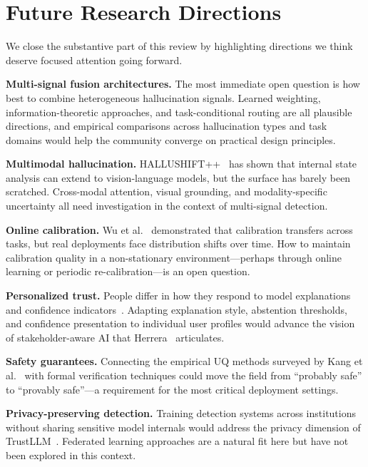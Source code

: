 \documentclass[journal]{IEEEtran}
\begin{document}
\section{Future Research Directions}

We close the substantive part of this review by highlighting directions we think deserve focused attention going forward.

\textbf{Multi-signal fusion architectures.} The most immediate open question is how best to combine heterogeneous hallucination signals. Learned weighting, information-theoretic approaches, and task-conditional routing are all plausible directions, and empirical comparisons across hallucination types and task domains would help the community converge on practical design principles.

\textbf{Multimodal hallucination.} HALLUSHIFT++~\cite{hallushift_pp} has shown that internal state analysis can extend to vision-language models, but the surface has barely been scratched. Cross-modal attention, visual grounding, and modality-specific uncertainty all need investigation in the context of multi-signal detection.

\textbf{Online calibration.} Wu et al.~\cite{calibrated_rl} demonstrated that calibration transfers across tasks, but real deployments face distribution shifts over time. How to maintain calibration quality in a non-stationary environment---perhaps through online learning or periodic re-calibration---is an open question.

\textbf{Personalized trust.} People differ in how they respond to model explanations and confidence indicators~\cite{human_trust}. Adapting explanation style, abstention thresholds, and confidence presentation to individual user profiles would advance the vision of stakeholder-aware AI that Herrera~\cite{xai_survey} articulates.

\textbf{Safety guarantees.} Connecting the empirical UQ methods surveyed by Kang et al.~\cite{uq_survey} with formal verification techniques could move the field from ``probably safe'' to ``provably safe''---a requirement for the most critical deployment settings.

\textbf{Privacy-preserving detection.} Training detection systems across institutions without sharing sensitive model internals would address the privacy dimension of TrustLLM~\cite{trustllm}. Federated learning approaches are a natural fit here but have not been explored in this context.
\end{document}
